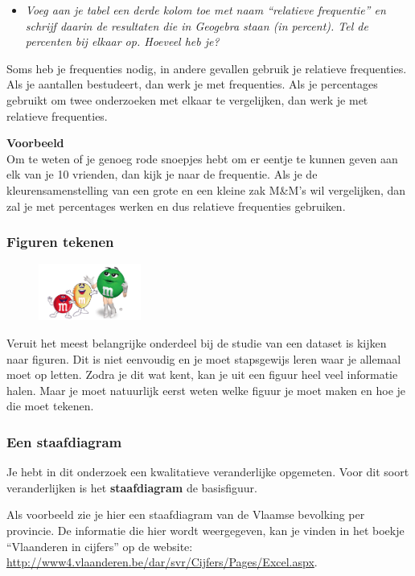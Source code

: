 \documentclass[11pt]{article}
\newcommand{\vraag}[2]{\begin{itemize}\item {\it #1} \vspace*{#2}\end{itemize}}
\begin{document}
\vraag{Voeg aan je tabel een derde kolom toe met naam “relatieve frequentie” en schrijf daarin de
resultaten die in Geogebra staan (in percent). Tel de percenten bij elkaar op. Hoeveel heb je?
}{3cm}

Soms heb je frequenties nodig, in andere gevallen gebruik je relatieve frequenties. Als je aantallen
bestudeert, dan werk je met frequenties. Als je percentages gebruikt om twee onderzoeken met
elkaar te vergelijken, dan werk je met relatieve frequenties.

{\bf Voorbeeld}\\
Om te weten of je genoeg rode snoepjes hebt om er eentje te kunnen geven aan elk van je 10
vrienden, dan kijk je naar de frequentie.
Als je de kleurensamenstelling van een grote en een kleine zak M\&M’s wil vergelijken, dan zal je
met percentages werken en dus relatieve frequenties gebruiken.



\subsubsection{Figuren tekenen}

\begin{figure}
  \vspace{-0.5cm}
  \includegraphics[width=0.3\textwidth]{MenM-fun.png}
\end{figure}

Veruit het meest belangrijke onderdeel bij de studie van een
dataset is kijken naar figuren. Dit is niet eenvoudig en je
moet stapsgewijs leren waar je allemaal moet op letten.
Zodra je dit wat kent, kan je uit een figuur heel veel
informatie halen. Maar je moet natuurlijk eerst weten welke
figuur je moet maken en hoe je die moet tekenen.

\subsubsection*{Een staafdiagram}

Je hebt in dit onderzoek een kwalitatieve veranderlijke opgemeten. Voor dit soort
veranderlijken is het {\bf staafdiagram} de basisfiguur.

Als voorbeeld zie je hier een staafdiagram
van de Vlaamse bevolking per provincie. De
informatie die hier wordt weergegeven, kan
je vinden in het boekje “Vlaanderen in
cijfers” op de website:
\url{http://www4.vlaanderen.be/dar/svr/Cijfers/Pages/Excel.aspx}.
\end{document}
